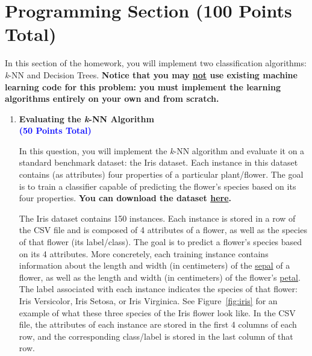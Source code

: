 \documentclass[]{article}
\newcommand{\HIGHLIGHT}[1]{\textcolor{blue}{\textbf{#1}}}
\begin{document}
\newpage

\vspace{1cm}
\section*{Programming Section (100 Points Total)}

In this section of the homework, you will implement two classification algorithms: \textit{k}-NN and Decision Trees. \textbf{Notice that you may \ul{not} use existing machine learning code for this problem: you must implement the learning algorithms entirely on your own and from scratch.} 

\vspace{0.35in}

\begin{enumerate}
    \item {\LARGE{\textbf{Evaluating the \textit{k}-NN Algorithm}}}\\\HIGHLIGHT{(50 Points Total)}\\
    \vspace{0.1in}
    
    In this question, you will implement the \textit{k}-NN algorithm and evaluate it on a standard benchmark dataset: the Iris dataset. Each instance in this dataset contains (as attributes) four properties of a particular plant/flower. The goal is to train a classifier capable of predicting the flower's species based on its four properties. \textbf{You can download the dataset \href{https://people.cs.umass.edu/~bsilva/courses/CMPSCI_589/Spring2022/homeworks/datasets/iris.csv}{here}.}
    
    The Iris dataset contains 150 instances. Each instance is stored in a row of the CSV file and is composed of 4 attributes of a flower, as well as the species of that flower (its label/class). The goal is to predict a flower's species based on its 4 attributes. More concretely, each training instance contains information about the length and width (in centimeters) of the \href{https://en.wikipedia.org/wiki/Sepal}{sepal} of a flower, as well as the length and width (in centimeters) of the flower's \href{https://en.wikipedia.org/wiki/Petal}{petal}. The label associated with each instance indicates the species of that flower: Iris Versicolor, Iris Setosa, or Iris Virginica. See Figure~\ref{fig:iris} for an example of what these three species of the Iris flower look like.
    In the CSV file, the attributes of each instance are stored in the first 4 columns of each row, and the corresponding class/label is stored in the last column of that row.
    

\end{enumerate}
\end{document}
